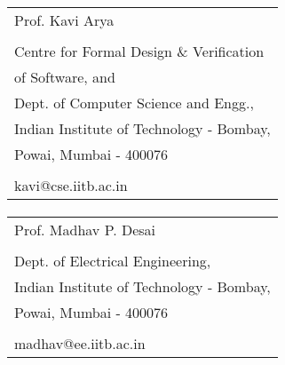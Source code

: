 \documentclass[12pt]{article}
\begin{document}
\newpage

\paragraph{}
\begin{tabular}{l}
  Prof. Kavi Arya\\
  \\
  Centre for Formal Design \& Verification\\
  of Software, and\\
  Dept. of Computer Science and Engg.,\\
  Indian Institute of Technology - Bombay,\\
  Powai, Mumbai - 400076\\
  \\
  kavi@cse.iitb.ac.in\\
\end{tabular}

\paragraph{}
\begin{tabular}{l}
  Prof. Madhav P. Desai\\
  \\
  Dept. of Electrical Engineering,\\
  Indian Institute of Technology - Bombay,\\
  Powai, Mumbai - 400076\\
  \\
  madhav@ee.iitb.ac.in\\
\end{tabular}

\paragraph{}


\newpage

\end{document}
